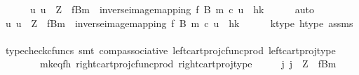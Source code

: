 \begin{isabellebody}
\ \ \ \ \ \ {\isacharparenleft}{\kern0pt}{\isasymexists}{\isacharbang}{\kern0pt}u{\isachardot}{\kern0pt}\ u\ {\isacharcolon}{\kern0pt}\ Z\ {\isasymrightarrow}\ {\isacharparenleft}{\kern0pt}f\isactrlsup {\isacharminus}{\kern0pt}B{\isasymrparr}\isactrlbsub m\isactrlesub {\isacharparenright}{\kern0pt}\ {\isasymand}\ inverse{\isacharunderscore}{\kern0pt}image{\isacharunderscore}{\kern0pt}mapping\ f\ B\ m\ {\isasymcirc}\isactrlsub c\ u\ {\isacharequal}{\kern0pt}\ {\isasymlangle}h{\isacharcomma}{\kern0pt}k{\isasymrangle}{\isacharparenright}{\kern0pt}{\isachardoublequoteclose}\isanewline
\ \ \ \ \isamarkupfalse%
\ auto\isanewline
\ \ \isamarkupfalse%
\ \isamarkupfalse%
\ {\isachardoublequoteopen}{\isasymexists}{\isacharbang}{\kern0pt}u{\isachardot}{\kern0pt}\ u\ {\isacharcolon}{\kern0pt}\ Z\ {\isasymrightarrow}\ {\isacharparenleft}{\kern0pt}f\isactrlsup {\isacharminus}{\kern0pt}B{\isasymrparr}\isactrlbsub m\isactrlesub {\isacharparenright}{\kern0pt}\ {\isasymand}\ inverse{\isacharunderscore}{\kern0pt}image{\isacharunderscore}{\kern0pt}mapping\ f\ B\ m\ {\isasymcirc}\isactrlsub c\ u\ {\isacharequal}{\kern0pt}\ {\isasymlangle}h{\isacharcomma}{\kern0pt}k{\isasymrangle}{\isachardoublequoteclose}\isanewline
\ \ \ \ \isamarkupfalse%
\ k{\isacharunderscore}{\kern0pt}type\ h{\isacharunderscore}{\kern0pt}type\ assms\isanewline
\ \ \ \ \isamarkupfalse%
\ {\isacharparenleft}{\kern0pt}typecheck{\isacharunderscore}{\kern0pt}cfuncs{\isacharcomma}{\kern0pt}\ smt\ comp{\isacharunderscore}{\kern0pt}associative{}\ left{\isacharunderscore}{\kern0pt}cart{\isacharunderscore}{\kern0pt}proj{\isacharunderscore}{\kern0pt}cfunc{\isacharunderscore}{\kern0pt}prod\ left{\isacharunderscore}{\kern0pt}cart{\isacharunderscore}{\kern0pt}proj{\isacharunderscore}{\kern0pt}type\isanewline
\ \ \ \ \ \ \ \ mk{\isacharunderscore}{\kern0pt}eq{\isacharunderscore}{\kern0pt}fh\ right{\isacharunderscore}{\kern0pt}cart{\isacharunderscore}{\kern0pt}proj{\isacharunderscore}{\kern0pt}cfunc{\isacharunderscore}{\kern0pt}prod\ right{\isacharunderscore}{\kern0pt}cart{\isacharunderscore}{\kern0pt}proj{\isacharunderscore}{\kern0pt}type{\isacharparenright}{\kern0pt}\isanewline
\ \ \isamarkupfalse%
\ \isamarkupfalse%
\ {\isachardoublequoteopen}{\isasymexists}j{\isachardot}{\kern0pt}\ j\ {\isacharcolon}{\kern0pt}\ Z\ {\isasymrightarrow}\ {\isacharparenleft}{\kern0pt}f\isactrlsup {\isacharminus}{\kern0pt}B{\isasymrparr}\isactrlbsub m\isactrlesub {\isacharparenright}{\kern0pt}\ {\isasymand}\isanewline

\end{isabellebody}
